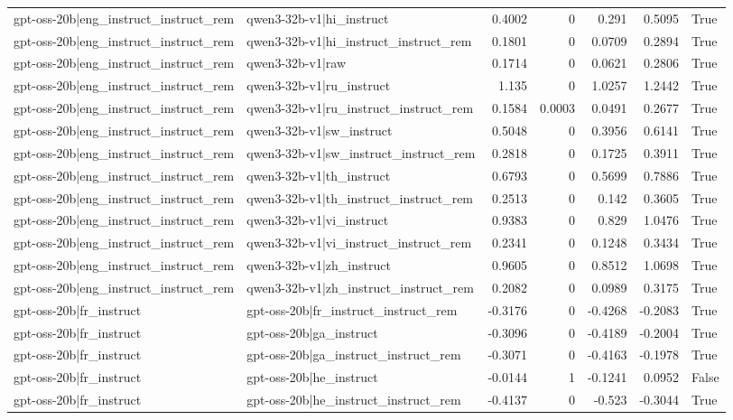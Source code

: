 \begin{table}
\begin{tabular}{l l r r r r l}
gpt-oss-20b|eng_instruct_instruct_rem & qwen3-32b-v1|hi_instruct & 0.4002 & 0 & 0.291 & 0.5095 & True \\
gpt-oss-20b|eng_instruct_instruct_rem & qwen3-32b-v1|hi_instruct_instruct_rem & 0.1801 & 0 & 0.0709 & 0.2894 & True \\
gpt-oss-20b|eng_instruct_instruct_rem & qwen3-32b-v1|raw & 0.1714 & 0 & 0.0621 & 0.2806 & True \\
gpt-oss-20b|eng_instruct_instruct_rem & qwen3-32b-v1|ru_instruct & 1.135 & 0 & 1.0257 & 1.2442 & True \\
gpt-oss-20b|eng_instruct_instruct_rem & qwen3-32b-v1|ru_instruct_instruct_rem & 0.1584 & 0.0003 & 0.0491 & 0.2677 & True \\
gpt-oss-20b|eng_instruct_instruct_rem & qwen3-32b-v1|sw_instruct & 0.5048 & 0 & 0.3956 & 0.6141 & True \\
gpt-oss-20b|eng_instruct_instruct_rem & qwen3-32b-v1|sw_instruct_instruct_rem & 0.2818 & 0 & 0.1725 & 0.3911 & True \\
gpt-oss-20b|eng_instruct_instruct_rem & qwen3-32b-v1|th_instruct & 0.6793 & 0 & 0.5699 & 0.7886 & True \\
gpt-oss-20b|eng_instruct_instruct_rem & qwen3-32b-v1|th_instruct_instruct_rem & 0.2513 & 0 & 0.142 & 0.3605 & True \\
gpt-oss-20b|eng_instruct_instruct_rem & qwen3-32b-v1|vi_instruct & 0.9383 & 0 & 0.829 & 1.0476 & True \\
gpt-oss-20b|eng_instruct_instruct_rem & qwen3-32b-v1|vi_instruct_instruct_rem & 0.2341 & 0 & 0.1248 & 0.3434 & True \\
gpt-oss-20b|eng_instruct_instruct_rem & qwen3-32b-v1|zh_instruct & 0.9605 & 0 & 0.8512 & 1.0698 & True \\
gpt-oss-20b|eng_instruct_instruct_rem & qwen3-32b-v1|zh_instruct_instruct_rem & 0.2082 & 0 & 0.0989 & 0.3175 & True \\
gpt-oss-20b|fr_instruct & gpt-oss-20b|fr_instruct_instruct_rem & -0.3176 & 0 & -0.4268 & -0.2083 & True \\
gpt-oss-20b|fr_instruct & gpt-oss-20b|ga_instruct & -0.3096 & 0 & -0.4189 & -0.2004 & True \\
gpt-oss-20b|fr_instruct & gpt-oss-20b|ga_instruct_instruct_rem & -0.3071 & 0 & -0.4163 & -0.1978 & True \\
gpt-oss-20b|fr_instruct & gpt-oss-20b|he_instruct & -0.0144 & 1 & -0.1241 & 0.0952 & False \\
gpt-oss-20b|fr_instruct & gpt-oss-20b|he_instruct_instruct_rem & -0.4137 & 0 & -0.523 & -0.3044 & True \\

\end{tabular}
\end{table}
